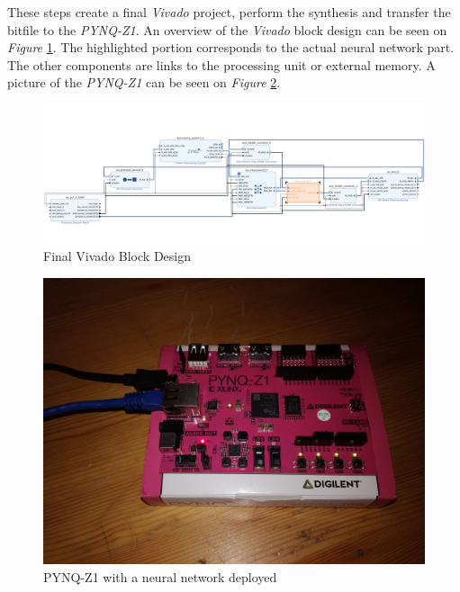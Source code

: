 These steps create a final \emph{Vivado} project, perform the synthesis and transfer the bitfile to the \emph{PYNQ-Z1}. An overview of the \emph{Vivado} block design can be seen on \emph{Figure} \ref{fig:ProjectBlockDesign}. The highlighted portion corresponds to the actual neural network part. The other components are links to the processing unit or external memory. A picture of the \emph{PYNQ-Z1} can be seen on \emph{Figure} \ref{fig:PYNQ-Z1}.

\begin{figure}[htbp]
	\centering
		\includegraphics[width=\textwidth]{Figures/ProjectBlockDesign.png}
	\caption[ProjectBlockDesign]{Final Vivado Block Design}
	\label{fig:ProjectBlockDesign}
\end{figure}

\begin{figure}[htbp]
	\centering
		\includegraphics[width=\textwidth]{Figures/PYNQ.png}
	\caption[PYNQ-Z1]{PYNQ-Z1 with a neural network deployed}
	\label{fig:PYNQ-Z1}
\end{figure}


\newpage

